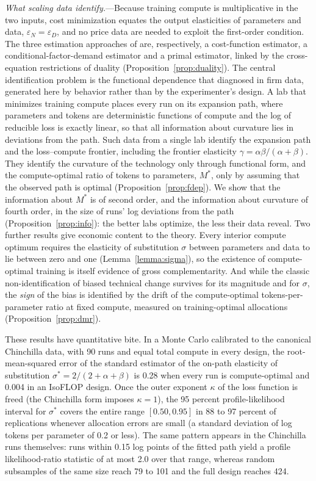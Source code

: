 \textit{What scaling data identify.}---Because training compute is multiplicative in the two inputs, cost
minimization equates the output elasticities of parameters and data, $\varepsilon_N = \varepsilon_D$, and no
price data are needed to exploit the first-order condition. The three estimation approaches of
\citet{hoffmann2022training} are, respectively, a cost-function estimator, a conditional-factor-demand estimator and
a primal estimator, linked by the cross-equation restrictions of duality (Proposition~\ref{prop:duality}). The
central identification problem is the functional dependence that \citet{ackerberg2015identification} diagnosed in
firm data, generated here by behavior rather than by the experimenter's design. A lab that minimizes training
compute places every run on its expansion path, where parameters and tokens are deterministic functions of compute
and the log of reducible loss is exactly linear, so that all information about curvature lies in deviations from
the path. Such data from a single lab identify the expansion path and the
loss--compute frontier, including the frontier elasticity $\gamma = \alpha\beta/(\alpha+\beta)$. They identify the curvature of the
technology only through functional form, and the compute-optimal ratio of tokens to parameters, $M^*$, only by
assuming that the observed path is optimal (Proposition~\ref{prop:fdep}). We show that the information about $M^*$
is of second order, and the information about curvature of fourth order, in the size of runs' log deviations from
the path (Proposition~\ref{prop:info}): the better labs optimize, the less their data reveal. Two further
results give economic content to the theory. Every interior compute optimum requires the elasticity of
substitution $\sigma$ between parameters and data to lie between zero and one (Lemma~\ref{lemma:sigma}), so the
existence of compute-optimal training is itself evidence of gross complementarity. And while the classic
non-identification of biased technical change \citep{diamond1978measurement} survives for its magnitude and for
$\sigma$, the \textit{sign} of the bias is identified by the drift of the compute-optimal tokens-per-parameter ratio at
fixed compute, measured on training-optimal allocations (Proposition~\ref{prop:dmr}).

These results have quantitative bite. In a Monte Carlo calibrated to the canonical Chinchilla data, with 90 runs
and equal total compute in every design, the root-mean-squared error of the standard estimator of the on-path elasticity of
substitution $\sigma^* = 2/(2+\alpha+\beta)$ is 0.28 when every run is compute-optimal and 0.004 in an IsoFLOP design. Once the
outer exponent $\kappa$ of the loss function is freed (the Chinchilla form imposes $\kappa=1$), the 95 percent
profile-likelihood interval for $\sigma^*$ covers the entire range $[0.50, 0.95]$ in 88 to 97 percent of
replications whenever allocation errors are small (a standard deviation of log tokens per parameter of 0.2 or less). The same pattern appears in the Chinchilla runs themselves: runs within 0.15 log
points of the fitted path yield a profile likelihood-ratio statistic of at most 2.0 over that range, whereas random
subsamples of the same size reach 79 to 101 and the full design reaches 424.

